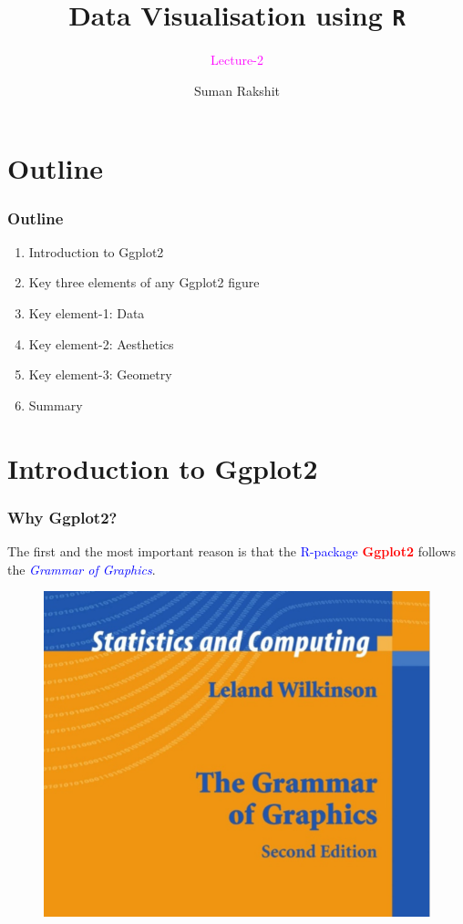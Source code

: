\documentclass{beamer}
\title[]{Data Visualisation using \texttt{R}}
\subtitle{\textcolor{magenta}{Lecture-2}}
\author[]{Suman Rakshit} %
\institute[School of EECMS, Curtin University] %
{
	\textcolor{magenta}{School of EECMS, Curtin University} %
}
\begin{document}
\begin{frame}
	\titlepage %
\end{frame}







\section{Outline}
\begin{frame}[t]\frametitle{Outline}
\begin{enumerate}
\item Introduction to Ggplot2
\item Key three elements of any Ggplot2 figure
\item Key element-1: Data
\item Key element-2: Aesthetics
\item Key element-3: Geometry
\item Summary
\end{enumerate}
\end{frame}


\section{Introduction to Ggplot2}
\begin{frame}\frametitle{Why Ggplot2?}
The first and the most important reason is that the \textcolor{blue}{R-package} \textbf{\textcolor{red}{Ggplot2}} follows the \textit{\textcolor{blue}{Grammar of Graphics}}.
\begin{figure}
\includegraphics[width=0.70\linewidth]{PlotsLec2/GrammerOfGraphics}
\end{figure}
\end{frame}
\end{document}
